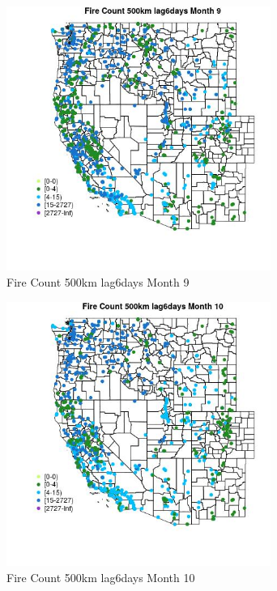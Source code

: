 \begin{figure} 
\centering  
\includegraphics[width=0.77\textwidth]{Code_Outputs/Report_ML_input_PM25_Step4_part_f_de_duplicated_aveswNAs_MapObsMo9Fire_Count_500km_lag6days.jpg} 
\caption{\label{fig:Report_ML_input_PM25_Step4_part_f_de_duplicated_aveswNAsMapObsMo9Fire_Count_500km_lag6days}Fire Count 500km lag6days Month 9} 
\end{figure} 
 

\begin{figure} 
\centering  
\includegraphics[width=0.77\textwidth]{Code_Outputs/Report_ML_input_PM25_Step4_part_f_de_duplicated_aveswNAs_MapObsMo10Fire_Count_500km_lag6days.jpg} 
\caption{\label{fig:Report_ML_input_PM25_Step4_part_f_de_duplicated_aveswNAsMapObsMo10Fire_Count_500km_lag6days}Fire Count 500km lag6days Month 10} 
\end{figure} 
 

